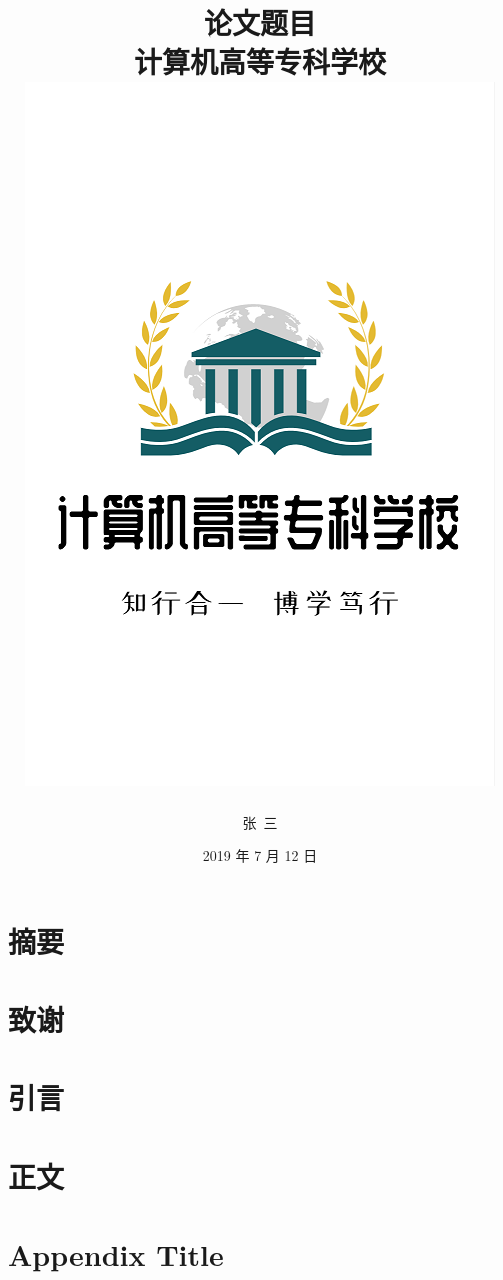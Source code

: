 \documentclass[12pt,twoside]{ctexrep}
\title{
{论文题目}\\
{\large 计算机高等专科学校}\\
{\includegraphics{logo.png}}
}
\author{张\ 三}
\date{2019 年 7 月 12 日}
\begin{document}
\maketitle

\chapter*{摘要}
\zhlipsum[1]
 
\chapter*{致谢}
\zhlipsum[1]
 
\tableofcontents

\chapter{引言}
\zhlipsum

\chapter{正文}
\zhlipsum

\appendix
\chapter{Appendix Title}
\zhlipsum[1]
\end{document}
